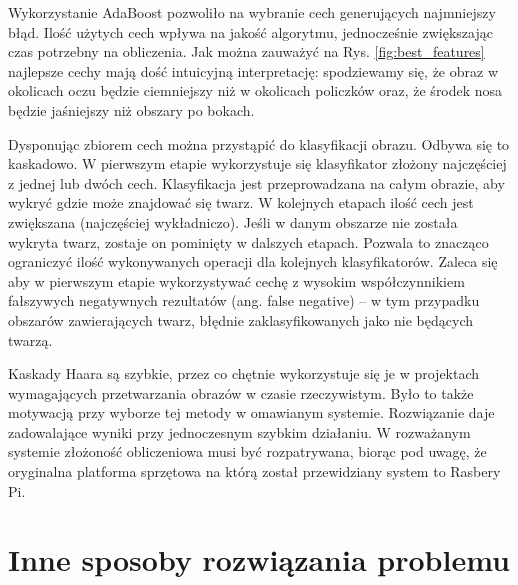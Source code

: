 \documentclass[oneside, eng]{mgr}
\begin{document}
Wykorzystanie AdaBoost pozwoliło na wybranie cech generujących najmniejszy błąd. Ilość użytych cech wpływa na jakość algorytmu, jednocześnie zwiększając czas potrzebny na obliczenia. Jak można zauważyć na Rys. \ref{fig:best_features} najlepsze cechy mają dość intuicyjną interpretację: spodziewamy się, że obraz w okolicach oczu będzie ciemniejszy niż w okolicach policzków oraz, że środek nosa będzie jaśniejszy niż obszary po bokach.

Dysponując zbiorem cech można przystąpić do klasyfikacji obrazu. Odbywa się to kaskadowo. W pierwszym etapie wykorzystuje się klasyfikator złożony najczęściej z jednej lub dwóch cech. Klasyfikacja jest przeprowadzana na całym obrazie, aby wykryć gdzie może znajdować się twarz. W kolejnych etapach ilość cech jest zwiększana (najczęściej wykładniczo). Jeśli w danym obszarze nie została wykryta twarz, zostaje on pominięty w dalszych etapach. Pozwala to znacząco ograniczyć ilość wykonywanych operacji dla kolejnych klasyfikatorów. Zaleca się aby w pierwszym etapie wykorzystywać cechę z wysokim współczynnikiem fałszywych negatywnych rezultatów (ang. false negative) -- w tym przypadku obszarów zawierających twarz, błędnie zaklasyfikowanych jako nie będących twarzą.

Kaskady Haara są szybkie, przez co chętnie wykorzystuje się je w projektach wymagających przetwarzania obrazów w czasie rzeczywistym. Było to także motywacją przy wyborze tej metody w omawianym systemie. Rozwiązanie daje zadowalające wyniki przy jednoczesnym szybkim działaniu. W rozważanym systemie złożoność obliczeniowa musi być rozpatrywana, biorąc pod uwagę, że oryginalna platforma sprzętowa na którą został przewidziany system to Rasbery Pi.

\section{Inne sposoby rozwiązania problemu} \label{geometrical_features}
\end{document}
